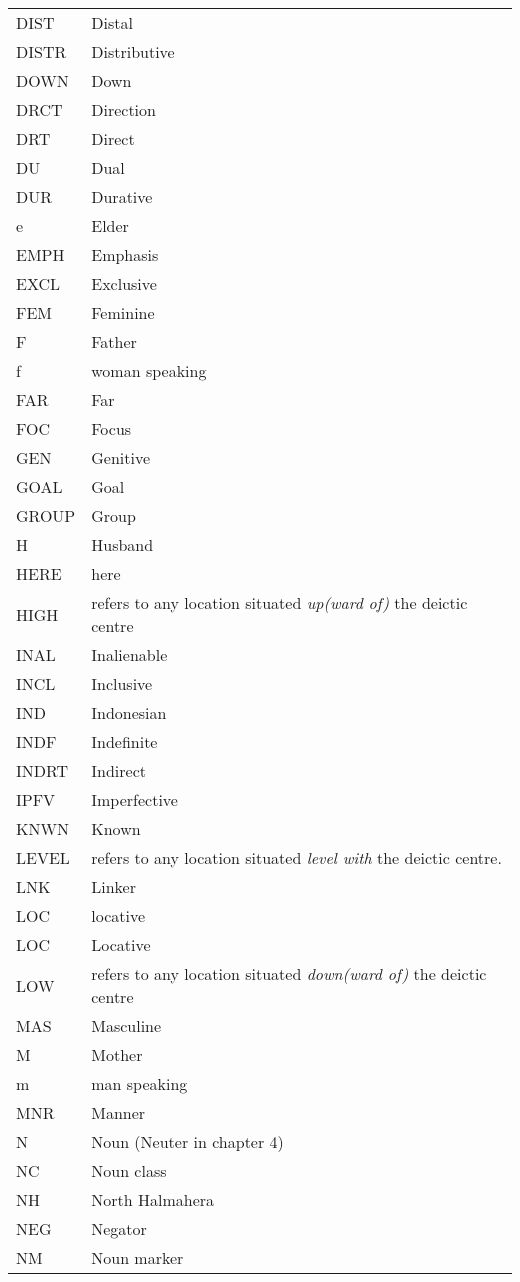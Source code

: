 \documentclass[a4paper]{article}
\begin{document}
\begin{flushleft}
\begin{supertabular}{m{0.8788598in}m{4.33446in}}
DIST &
Distal\\
DISTR &
Distributive\\
DOWN &
Down\\
DRCT &
Direction\\
DRT &
Direct\\
DU &
Dual\\
DUR &
Durative\\
e &
Elder\\
EMPH &
Emphasis\\
EXCL &
Exclusive\\
FEM &
Feminine \\
F &
Father\\
f &
woman speaking\\
FAR &
Far\\
FOC &
Focus\\
GEN &
Genitive\\
GOAL  &
Goal\\
GROUP &
Group\\
H &
Husband\\
HERE &
here\\
HIGH &
refers to any location situated \textit{up(ward of) }the deictic centre\\
INAL &
Inalienable\\
INCL &
Inclusive \\
IND &
Indonesian\\
INDF &
Indefinite\\
INDRT &
Indirect\\
IPFV &
Imperfective\\
KNWN &
Known\\
LEVEL &
refers to any location situated \textit{level with }the deictic centre.\\
LNK &
Linker\\
LOC &
locative\\
LOC &
Locative\\
LOW &
refers to any location situated \textit{down(ward of)} the deictic centre\\
MAS &
Masculine \\
M &
Mother\\
m &
man speaking\\
MNR &
Manner\\
N &
Noun (Neuter in chapter 4)\\
NC &
Noun class\\
NH &
North Halmahera\\
NEG &
Negator\\
NM &
Noun marker \\

\end{supertabular}
\end{flushleft}
\end{document}
